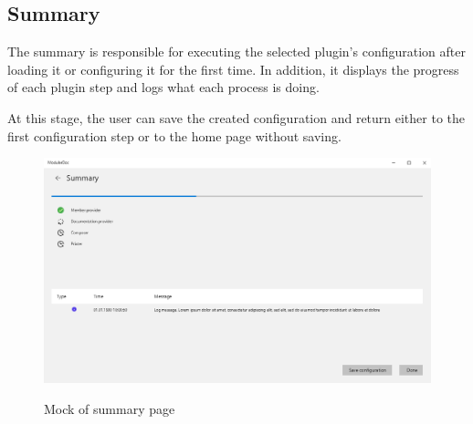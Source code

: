 \pagebreak
\subsection{Summary}

The summary is responsible for executing the selected plugin's configuration after loading it or configuring it for the first time. In addition, it displays the progress of each plugin step and logs what each process is doing.

At this stage, the user can save the created configuration and return either to the first configuration step or to the home page without saving.

\begin{figure}[H]
    \includegraphics[width=\linewidth]{img/mockSummary.png}
    \label{fig:summaryPage}
    \caption{Mock of summary page}
\end{figure}
